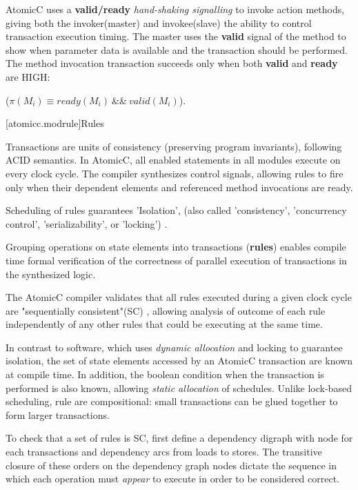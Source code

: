 AtomicC uses a \textbf{valid/ready} \textit{hand-shaking signalling}
\cite{Fletcher2009, AXISpec} to invoke action methods,
giving both the invoker(master) and invokee(slave) the ability to control transaction
execution timing.
The master uses the \textbf{valid} signal
of the method to show when parameter data is available and the transaction should be performed.
The method invocation transaction succeeds only when
both \textbf{valid} and \textbf{ready} are HIGH:

 ($\pi(M_{i}) \equiv ready(M_{i})\ \&\&\ valid(M_{i})$).

[atomicc.modrule]{Rules}

Transactions are units of consistency (preserving program invariants), following ACID semantics.
In AtomicC, all enabled statements in all modules execute on every clock cycle.
The compiler synthesizes control signals, allowing rules to fire
only when their dependent elements and referenced method invocations are ready.

Scheduling of rules guarantees 'Isolation',
(also called 'consistency', 'concurrency control', 'serializability', or 'locking')
\cite[Sec.~7.1]{GrayR93}.

Grouping operations on state elements into transactions (\textbf{rules})
enables compile time formal verification of the correctness of
parallel execution of transactions
in the synthesized logic.
\cite{nurvitadhi2011automatic}
\cite{fox2003algebraic}

The AtomicC compiler
validates that all rules executed during a given clock cycle are
"sequentially consistent"(SC) \cite{Lamport:1979:MMC:1311099.1311750},
allowing analysis of
outcome of each rule independently of any other rules that could be executing at the same time.

In contrast to software, which uses \textit{dynamic allocation}\cite[p.~377]{GrayR93}
and locking\cite[Sec.~11.2]{OV11} to guarantee isolation,
the set of state elements accessed by an AtomicC transaction are known at compile time.
In addition, the boolean condition when the transaction is performed
is also known, allowing \textit{static allocation}\cite[Sec.~7.3.1]{GrayR93} of schedules.
Unlike lock-based scheduling,
rule are compositional: small transactions can be glued together to form larger transactions.

To check that a set of rules is SC, first
define a dependency digraph with node for each transactions and
dependency arcs from loads to stores.
The transitive closure of these orders on the dependency graph nodes dictate
the sequence in which each operation must \textit{appear} to execute in order to
be considered correct.

